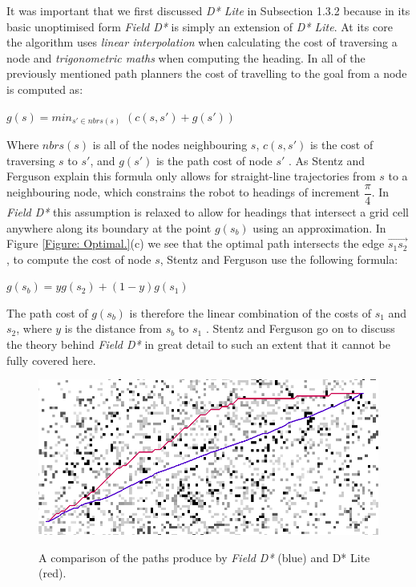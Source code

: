 \noindent
It was important that we first discussed \textit{D* Lite} in Subsection 1.3.2 because in its basic unoptimised form \textit{Field D*} is simply an extension of \textit{D* Lite}. At its core the algorithm uses \textit{linear interpolation} when calculating the cost of traversing a node and \textit{trigonometric maths} when computing the heading. In all of the previously mentioned path planners the cost of travelling to the goal from a node is computed as:\ 

\begin{center}
\begin{large}
$g(s) = min_{s'\in nbrs(s)}$ $(c(s,s') + g(s'))$
\end{large}
\end{center}

\noindent
Where $nbrs(s)$ is all of the nodes neighbouring $s$, $c(s,s')$ is the cost of traversing $s$ to $s'$, and $g(s')$ is the path cost of node $s'$ \cite{FIELD2}. As Stentz and Ferguson explain this formula only allows for straight-line trajectories from $s$ to a neighbouring node, which constrains the robot to headings of increment $\dfrac{\pi}{4}$. In \textit{Field D*} this assumption is relaxed to allow for headings that intersect a grid cell anywhere along its boundary at the point $g(s_{b})$ using an approximation. In Figure \ref{Figure: Optimal.}(c) we see that the optimal path intersects the edge $\overrightarrow{s_{1}s_{2}}$, to compute the cost of node $s$, Stentz and Ferguson use the following formula:

\begin{center}
\begin{large}
$g(s_{b}) = yg(s_{2}) + (1 - y)g(s_{1})$
\end{large}
\end{center}

\noindent
The path cost of $g(s_{b})$ is therefore the linear combination of the costs of $s_{1}$ and $s_{2}$, where $y$ is the distance from $s_{b}$ to $s_{1}$ \cite{FIELD2}. Stentz and Ferguson go on to discuss the theory behind \textit{Field D*} in great detail to such an extent that it cannot be fully covered here.

\begin{figure}[htbp]

\center \includegraphics[width=350pt]{illustrations/field_d_path}\\
\caption{A comparison of the paths produce by \textit{Field D*} (blue) and D* Lite (red). \cite{FIELD}} 
\label{Figure: Field D Path.}

\end{figure}  


